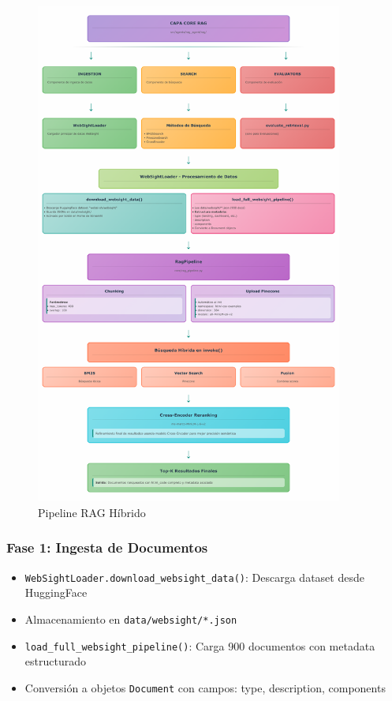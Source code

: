 \documentclass[12pt,a4paper]{article}
\begin{document}
\begin{figure}[H]
\centering
\includegraphics[width=0.9\textwidth]{../docs/diagrama-flujo-rag-pipeline.png}
\caption{Pipeline RAG Híbrido}
\label{fig:rag}
\end{figure}

\subsubsection{Fase 1: Ingesta de Documentos}
\begin{itemize}
    \item \texttt{WebSightLoader.download\_websight\_data()}: Descarga dataset desde HuggingFace
    \item Almacenamiento en \texttt{data/websight/*.json}
    \item \texttt{load\_full\_websight\_pipeline()}: Carga 900 documentos con metadata estructurado
    \item Conversión a objetos \texttt{Document} con campos: type, description, components
\end{itemize}
\end{document}
